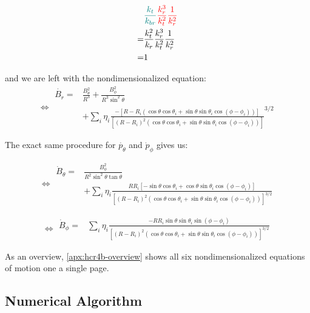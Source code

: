 \begin{align}
    & \textcolor{teal}{\frac{k_t}{k_{br}}} \textcolor{red}{\frac{k_r^3}{k_t^2}\frac{1}{k_r^2}} \\
    = &\frac{k_t^2}{k_r} \frac{k_r^3}{k_t^2} \frac{1}{k_r^2} \\
    = &1
\end{align}


and we are left with the nondimensionalized equation:
\begin{equation}
    \Leftrightarrow
    \boxed{
        \!\begin{aligned}
        \dot{B_r} = &\frac{B_\theta^2}{R^3} + \frac{B_\phi^2}{R^3 \sin^2{\theta}} \\
        & + \sum\limits_{i} \eta_i \frac{-\left[R - R_i \left(\cos{\theta}\cos{\theta_i} + \sin{\theta}\sin{\theta_i}\cos{(\phi - \phi_i)}\right) \right]}{\left[(R - R_i)^2 \left(\cos{\theta}\cos{\theta_i} + \sin{\theta}\sin{\theta_i}\cos{(\phi - \phi_i)} \right) \right]}^{3/2}
        \end{aligned}
    }
\end{equation}

The exact same procedure for \(\dot{p_\theta}\) and \(\dot{p}_\phi\) gives us:

\begin{equation}
    \Leftrightarrow
    \boxed{
        \!\begin{aligned}
            \dot{B}_\theta = &\frac{B_\phi^2}{R^2 \sin^2{\theta} \tan{\theta}} \\
            &+ \sum\limits_{i} \eta_i \frac{R R_i \left[-\sin{\theta}\cos{\theta_i} + \cos{\theta}\sin{\theta_i}\cos{(\phi - \phi_i)} \right]}{\left[(R - R_i)^2 \left(\cos{\theta}\cos{\theta_i} + \sin{\theta}\sin{\theta_i}\cos{(\phi - \phi_i)} \right) \right]^{3/2}}
        \end{aligned}
    }
\end{equation}

\begin{equation}
    \Leftrightarrow
    \boxed{
        \!\begin{aligned}
            \dot{B}_\phi = &\sum\limits_{i} \eta_i \frac{- R R_i \sin{\theta}\sin{\theta_i}\sin{(\phi - \phi_i)}}{\left[(R - R_i)^2 \left(\cos{\theta}\cos{\theta_i} + \sin{\theta}\sin{\theta_i}\cos{(\phi - \phi_i)} \right) \right]^{3/2}}
        \end{aligned}
    }
\end{equation}

As an overview, \cref{apx:hcr4b-overview} shows all six nondimensionalized equations of motion one a single page.

\subsection{Numerical Algorithm}
